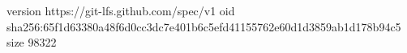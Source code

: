 version https://git-lfs.github.com/spec/v1
oid sha256:65f1d63380a48f6d0cc3dc7e401b6c5efd41155762e60d1d3859ab1d178b94c5
size 98322
